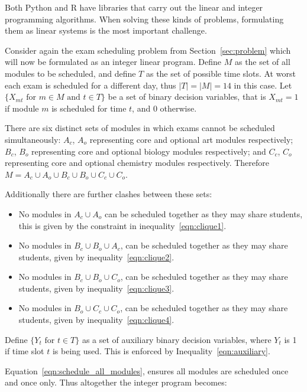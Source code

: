 Both Python and R have libraries that carry out the linear and integer
programming algorithms. When solving these kinds of problems, formulating
them as linear systems is the most important challenge.

Consider again the exam scheduling problem from Section~\ref{sec:problem} which
will now be formulated as an integer linear program.
Define \(M\) as the set of all modules to be scheduled, and define \(T\) as the set
of possible time slots. At worst each exam is
scheduled for a different day, thus \(|T| = |M| = 14\) in this case.
Let \(\{X_{mt} \text{ for } m \in M \text{ and } t \in T\}\) be a set of binary
decision variables, that is \(X_{mt} = 1\) if module \(m\) is scheduled for time
\(t\), and \(0\) otherwise.

There are six distinct sets of modules in which exams cannot be scheduled
simultaneously: \(A_c\), \(A_o\) representing core and optional art modules
respectively; \(B_c\), \(B_o\) representing core and optional biology modules
respectively; and \(C_c\), \(C_o\) representing core and optional chemistry modules
respectively.
Therefore \(M = A_c \cup A_o \cup B_c \cup B_o \cup C_c \cup C_o\).

Additionally there are further clashes between these sets:
\begin{itemize}
  \item No modules in \(A_c \cup A_o\) can be scheduled together as they may
  share students, this is given by the constraint in inequality~\ref{eqn:clique1}.
  \item No modules in \(B_c \cup B_o \cup A_c\), can be scheduled together as
  they may share students, given by inequality~\ref{eqn:clique2}.
  \item No modules in \(B_c \cup B_o \cup C_o\), can be scheduled together as
  they may share students, given by inequality~\ref{eqn:clique3}.
  \item No modules in \(B_o \cup C_c \cup C_o\), can be scheduled together as
  they may share students, given by inequality~\ref{eqn:clique4}.
\end{itemize}

Define \(\{Y_t \text{ for } t \in T\}\) as a set of auxiliary binary
decision variables, where \(Y_t\) is 1 if time slot \(t\) is being used. This is
enforced by Inequality~\ref{eqn:auxiliary}.

Equation~\ref{eqn:schedule_all_modules},
ensures all modules are scheduled once and once only.
Thus altogether the integer program becomes:

